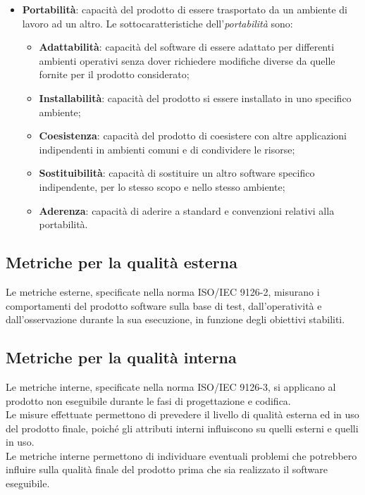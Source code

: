 \begin{itemize}
\begin{itemize}
	\end{itemize}
\item \textbf{Portabilità}: capacità del prodotto di essere trasportato da un ambiente di lavoro ad un altro. Le sottocaratteristiche dell'\textit{portabilità} sono:
	\begin{itemize}
	\item \textbf{Adattabilità}: capacità del software di essere adattato per differenti ambienti operativi senza dover richiedere modifiche diverse da quelle fornite per il prodotto considerato;
	\item \textbf{Installabilità}: capacità del prodotto si essere installato in uno specifico ambiente;
	\item \textbf{Coesistenza}: capacità del prodotto di coesistere con altre applicazioni indipendenti in ambienti comuni e di condividere le risorse;
	\item \textbf{Sostituibilità}: capacità di sostituire un altro software specifico indipendente, per lo stesso scopo e nello stesso ambiente;
	\item \textbf{Aderenza}: capacità di aderire a standard e convenzioni relativi alla portabilità.
	\end{itemize}
\end{itemize}

\subsection{Metriche per la qualità esterna}
Le metriche esterne, specificate nella norma ISO/IEC 9126-2, misurano i comportamenti del prodotto software sulla base di test, dall'operatività e dall'osservazione durante la sua esecuzione, in funzione degli obiettivi stabiliti.

\subsection{Metriche per la qualità interna}
Le metriche interne, specificate nella norma ISO/IEC 9126-3, si applicano al prodotto non eseguibile durante le fasi di progettazione e codifica. \\
Le misure effettuate permettono di prevedere il livello di qualità esterna ed in uso del prodotto finale, poiché gli attributi interni influiscono su quelli esterni e quelli in uso. \\
Le metriche interne permettono di individuare eventuali problemi che potrebbero influire sulla qualità finale del prodotto prima che sia realizzato il software eseguibile.

